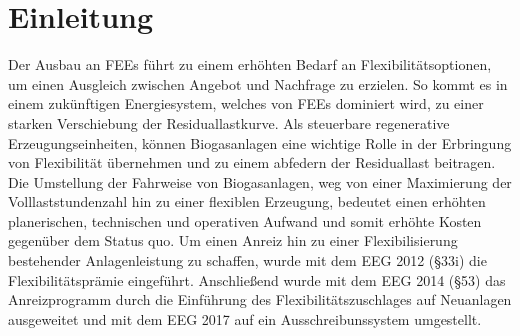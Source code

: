 \section{Einleitung}

Der Ausbau an \glspl{FEE} führt zu einem erhöhten Bedarf an Flexibilitätsoptionen, um einen Ausgleich zwischen Angebot und Nachfrage zu erzielen. So kommt es in einem zukünftigen Energiesystem, welches von \glspl{FEE} dominiert wird, zu einer starken Verschiebung der Residuallastkurve. Als steuerbare regenerative Erzeugungseinheiten, können Biogasanlagen eine wichtige Rolle in der Erbringung von Flexibilität übernehmen und zu einem abfedern der Residuallast beitragen. \parencite{ISE2013}\medskip\\
Die Umstellung der Fahrweise von Biogasanlagen, weg von einer Maximierung der Volllaststundenzahl hin zu einer flexiblen Erzeugung, bedeutet einen erhöhten planerischen, technischen und operativen Aufwand und somit erhöhte Kosten gegenüber dem Status quo. Um einen Anreiz hin zu einer Flexibilisierung bestehender Anlagenleistung zu schaffen, wurde mit dem \gls{EEG} 2012 (\S 33i) die Flexibilitätsprämie eingeführt. Anschließend wurde mit dem \gls{EEG} 2014 (\S 53) das Anreizprogramm durch die Einführung des Flexibilitätszuschlages auf Neuanlagen ausgeweitet und mit dem \gls{EEG} 2017 auf ein Ausschreibunssystem umgestellt. \parencite{DanielGromke2019}

